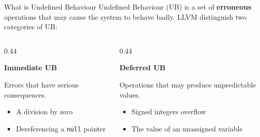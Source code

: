 \begin{frame}{What is Undefined Behaviour}
  Undefined Behaviour (UB) is a set of \textbf{erroneous} operations that may cause the system to behave badly. LLVM distinguish two categories of UB:
\begin{columns}[T]
    \begin{column}{0.44\textwidth}
        \begin{center}
        \large{\textbf{Immediate UB}}\\
        \end{center}
        Errors that have serious consequences.
        \begin{itemize}
            \item A division by zero
            \item Dereferencing a \texttt{null} pointer
        \end{itemize}
    \end{column}
    \begin{column}{0.44\textwidth}
        \begin{center}
        \large{\textbf{Deferred UB}}\\
        \end{center}
        Operations that may produce unpredictable values.
        \begin{itemize}
            \item Signed integers overflow
            \item The value of an unassigned variable
        \end{itemize}
    \end{column}
\end{columns}
\end{frame}
